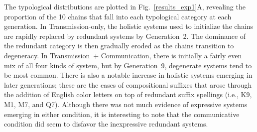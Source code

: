 \documentclass[doc,biblatex]{apa7}
\begin{document}
The typological distributions are plotted in Fig.~\ref{results_exp1}A, revealing the proportion of the 10 chains that fall into each typological category at each generation. In Transmission-only, the holistic systems used to initialize the chains are rapidly replaced by redundant systems by Generation~2. The dominance of the redundant category is then gradually eroded as the chains transition to degeneracy. In Transmission~+ Communication, there is initially a fairly even mix of all four kinds of system, but by Generation~9, degenerate systems tend to be most common. There is also a notable increase in holistic systems emerging in later generations; these are the cases of compositional suffixes that arose through the addition of English color letters on top of redundant suffix spellings (i.e., K9, M1, M7, and Q7). Although there was not much evidence of expressive systems emerging in either condition, it is interesting to note that the communicative condition did seem to disfavor the inexpressive redundant systems.
\end{document}
